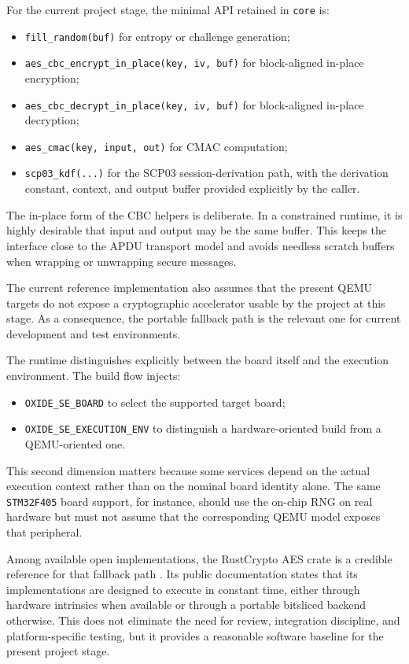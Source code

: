 For the current project stage, the minimal API retained in \texttt{core} is:
\begin{itemize}
\item \texttt{fill\_random(buf)} for entropy or challenge generation;
\item \texttt{aes\_cbc\_encrypt\_in\_place(key, iv, buf)} for block-aligned
  in-place encryption;
\item \texttt{aes\_cbc\_decrypt\_in\_place(key, iv, buf)} for block-aligned
  in-place decryption;
\item \texttt{aes\_cmac(key, input, out)} for CMAC computation;
\item \texttt{scp03\_kdf(...)} for the SCP03 session-derivation path, with the
  derivation constant, context, and output buffer provided explicitly by the
  caller.
\end{itemize}

The in-place form of the CBC helpers is deliberate. In a constrained runtime,
it is highly desirable that input and output may be the same buffer. This keeps
the interface close to the APDU transport model and avoids needless scratch
buffers when wrapping or unwrapping secure messages.

The current reference implementation also assumes that the present QEMU targets
do not expose a cryptographic accelerator usable by the project at this stage.
As a consequence, the portable fallback path is the relevant one for current
development and test environments.

The runtime distinguishes explicitly between the board itself and the
execution environment. The build flow injects:
\begin{itemize}
\item \texttt{OXIDE\_SE\_BOARD} to select the supported target board;
\item \texttt{OXIDE\_SE\_EXECUTION\_ENV} to distinguish a hardware-oriented build
  from a QEMU-oriented one.
\end{itemize}

This second dimension matters because some services depend on the actual
execution context rather than on the nominal board identity alone. The same
\texttt{STM32F405} board support, for instance, should use the on-chip RNG on
real hardware but must not assume that the corresponding QEMU model exposes
that peripheral.

Among available open implementations, the RustCrypto AES crate is a credible
reference for that fallback path \cite{rustcrypto-aes}. Its public
documentation states that its implementations are designed to execute in
constant time, either through hardware intrinsics when available or through a
portable bitsliced backend otherwise. This does not eliminate the need for
review, integration discipline, and platform-specific testing, but it provides
a reasonable software baseline for the present project stage.

